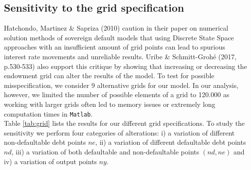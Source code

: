 \subsection{Sensitivity to the grid specification}
Hatchondo, Martinez \& Sapriza (2010) caution in their paper on numerical solution methods of sovereign default models that using Discrete State Space approaches with an insufficient amount of grid points can lead to spurious interest rate movements and unreliable results. Uribe \& Schmitt-Grohé (2017, p.530-533) also support this critique by showing that increasing or decreasing the endowment grid can alter the results of the model. To test for possible misspecification, we consider 9 alternative grids for our model. In our analysis, however, we limited the number of possible elements of a grid to 120.000 as working with larger grids often led to memory issues or extremely long computation times in \texttt{Matlab}.\\

Table \ref{tab:grid} lists the results for our different grid specifications. To study the sensitivity we perform four categories of alterations: i) a variation of different non-defaultable debt points $ne$, ii) a variation of different defaultable debt points $nd$, iii) a variation of both defaultable and non-defaultable points $(nd,ne)$ and iv) a variation of output points $ny$.\\

